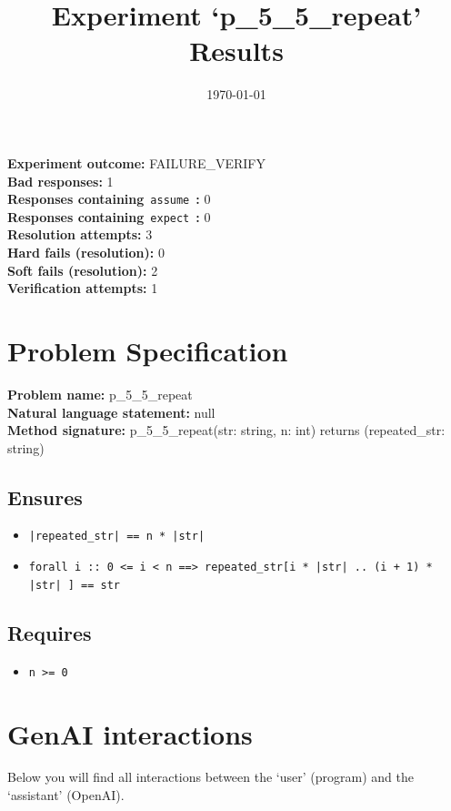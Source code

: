 \documentclass{article}
\begin{document}
\title{Experiment `p\_5\_5\_repeat' Results}
\author{\today}
\date{}
\maketitle
\textbf{Experiment outcome: }FAILURE\_VERIFY
\\\textbf{Bad responses: }1
\\\textbf{Responses containing}~\texttt{assume}~\textbf{: }0
\\\textbf{Responses containing}~\texttt{expect}~\textbf{: }0
\\\textbf{Resolution attempts: }3
\\\textbf{Hard fails (resolution): }0
\\\textbf{Soft fails (resolution): }2
\\\textbf{Verification attempts: }1
\section*{Problem Specification}
\textbf{Problem name: }p\_5\_5\_repeat
\\\textbf{Natural language statement: }null
\\\textbf{Method signature: }p\_5\_5\_repeat(str: string, n: int) returns (repeated\_str: string)
\subsection*{Ensures}
\begin{itemize}
\item \texttt{|repeated\_str| == n * |str|}
\item \texttt{forall i :: 0 <= i < n ==> repeated\_str[i * |str| .. (i + 1) * |str| ] == str}
\end{itemize}
\subsection*{Requires}
\begin{itemize}
\item \texttt{n >= 0}
\end{itemize}
\clearpage
\section*{GenAI interactions}
Below you will find all interactions between the `user' (program) and the `assistant' (OpenAI).
\end{document}
